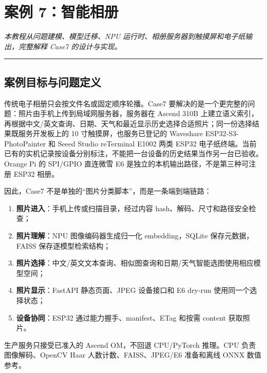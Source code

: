 \chapter{案例 7：智能相册}\label{ux6848ux4f8b-7ux667aux80fdux76f8ux518c}

\emph{本教程从问题建模、模型迁移、NPU
运行时、相册服务器到触摸屏和电子纸输出，完整解释 Case7 的设计与实现。}

\begin{center}\rule{0.5\linewidth}{0.5pt}\end{center}

\section{案例目标与问题定义}\label{ux6848ux4f8bux76eeux6807ux4e0eux95eeux9898ux5b9aux4e49}

传统电子相册只会按文件名或固定顺序轮播。Case7
要解决的是一个更完整的问题：照片由手机上传到局域网服务器，服务器在
Ascend 310B
上建立语义索引，再根据中文/英文查询、日期、天气和最近显示历史选择合适照片；同一份选择结果既服务开发板上的
10 寸触摸屏，也服务已登记的 Waveshare ESP32-S3-PhotoPainter 和 Seeed
Studio reTerminal E1002 两类 ESP32
电子纸终端。当前已有的实机记录按设备分别标注，不能把一台设备的历史结果当作另一台已验收。Orange
Pi 的 SPI/GPIO 直连微雪 E6 是独立的本机输出路径，不是第三种可注册 ESP32
相册。

因此，Case7 不是单独的``图片分类脚本''，而是一条端到端链路：

\begin{enumerate}
\def\labelenumi{\arabic{enumi}.}
\tightlist
\item
  \textbf{照片进入}：手机上传或扫描目录，经过内容
  hash、解码、尺寸和路径安全检查；
\item
  \textbf{照片理解}：NPU 图像编码器生成归一化 embedding，SQLite
  保存元数据，FAISS 保存逐模型检索结构；
\item
  \textbf{照片选择}：中文/英文文本查询、相似图查询和日期/天气智能选图使用相应模型空间；
\item
  \textbf{照片显示}：FastAPI 静态页面、JPEG 设备接口和 E6 dry-run
  使用同一个选择状态；
\item
  \textbf{设备协同}：ESP32 通过能力握手、manifest、ETag 和按需 content
  获取照片。
\end{enumerate}

生产服务只接受已准入的 Ascend OM，不回退 CPU/PyTorch 推理。CPU
负责图像解码、OpenCV Haar 人数计数、FAISS、JPEG/E6 准备和离线 ONNX
数值参考。

